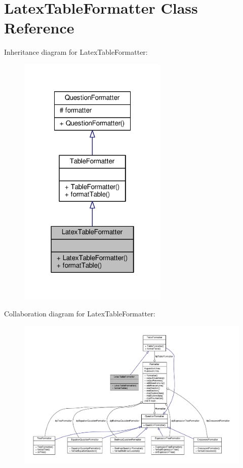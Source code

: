 \hypertarget{classLatexTableFormatter}{}\section{Latex\+Table\+Formatter Class Reference}
\label{classLatexTableFormatter}


Inheritance diagram for Latex\+Table\+Formatter\+:
\nopagebreak
\begin{figure}[H]
\begin{center}
\leavevmode
\includegraphics[width=202pt]{classLatexTableFormatter__inherit__graph}
\end{center}
\end{figure}


Collaboration diagram for Latex\+Table\+Formatter\+:
\nopagebreak
\begin{figure}[H]
\begin{center}
\leavevmode
\includegraphics[width=350pt]{classLatexTableFormatter__coll__graph}
\end{center}
\end{figure}

